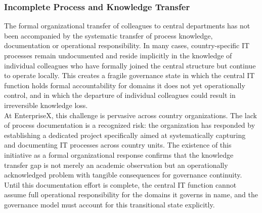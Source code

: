 \subsubsection{Incomplete Process and Knowledge Transfer}
\label{subsubsec:IncompleteKnowledgeTransfer}
The formal organizational transfer of colleagues to central departments has not been accompanied by the systematic transfer of process knowledge, documentation or operational responsibility.
In many cases, country-specific IT processes remain undocumented and reside implicitly in the knowledge of individual colleagues who have formally joined the central structure but continue to operate locally.
This creates a fragile governance state in which the central IT function holds formal accountability for domains it does not yet operationally control, and in which the departure of individual colleagues could result in irreversible knowledge loss.
\\
At EnterpriseX, this challenge is pervasive across country organizations.
The lack of process documentation is a recognized risk: the organization has responded by establishing a dedicated project specifically aimed at systematically capturing and documenting IT processes across country units.
The existence of this initiative as a formal organizational response confirms that the knowledge transfer gap is not merely an academic observation but an operationally acknowledged problem with tangible consequences for governance continuity.
Until this documentation effort is complete, the central IT function cannot assume full operational responsibility for the domains it governs in name, and the governance model must account for this transitional state explicitly.

